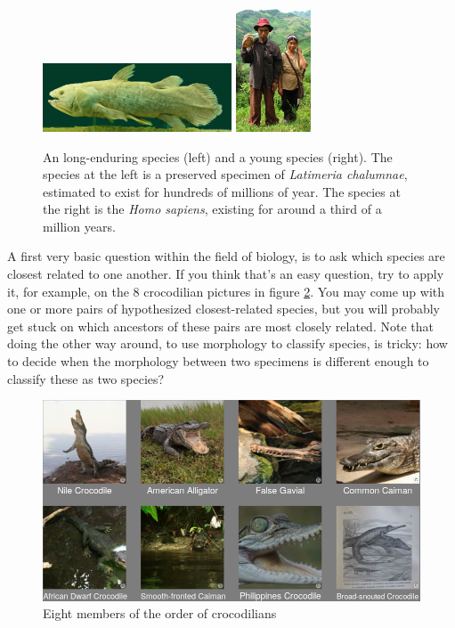 \begin{figure}[H]
  \includegraphics[width=0.5\textwidth]{latimeria_chalumnae.jpg}
  \includegraphics[width=0.2\textwidth]{homo_sapiens.jpg}
  \caption{
    An long-enduring species (left) and a young species (right).
    The species at the left is a preserved specimen of \textit{Latimeria chalumnae}, 
    estimated to exist for hundreds of millions of year.
    The species at the right is the \textit{Homo sapiens}, 
    existing for around a third of a million years.
  }
  \label{fig:long_enduring_and_young_species}
\end{figure}


A first very basic question within the field of biology,
is to ask which species are closest related to
one another. If you think that's an easy question, try to apply it, 
for example, on the 8 crocodilian pictures in figure \ref{fig:crocodialians}.
You may come up with one or more pairs of hypothesized closest-related species,
but you will probably get stuck on which ancestors of these pairs
are most closely related. Note that doing the other way around, to use
morphology to classify species, is tricky: how to decide when the morphology 
between two specimens is different enough to classify these as two species?

\begin{figure}[H]
  \includegraphics[width=1.0\textwidth]{crocodilians.png}
  \caption{
    Eight members of the order of crocodilians
  }
  \label{fig:crocodialians}
\end{figure}

